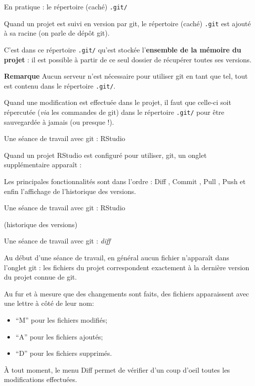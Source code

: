 \documentclass[12pt,handout,ignorenonframetext,]{beamer}
\providecommand{\tightlist}{%
  \setlength{\itemsep}{0pt}\setlength{\parskip}{0pt}}
\newcommand{\intertitre}[1]{\textbf{\textcolor{redInsee}{#1}}}
\begin{document}
\begin{frame}[fragile]{En pratique : le répertoire (caché)
\texttt{.git/}}

Quand un projet est suivi en version par git, le répertoire (caché)
\texttt{.git} est ajouté à sa racine (on parle de dépôt git).

\bigskip \pause C'est dans ce répertoire \texttt{.git/} qu'est stockée
l'\textbf{ensemble de la mémoire du projet} : il est possible à partir
de ce seul dossier de récupérer toutes ses versions.

\bigskip \pause \intertitre{Remarque} Aucun \og serveur \fg{} n'est
nécessaire pour utiliser git en tant que tel, tout est contenu dans le
répertoire \texttt{.git/}.

\bigskip \pause Quand une modification est effectuée dans le projet, il
faut que celle-ci soit répercutée (\emph{via} les commandes de git) dans
le répertoire \texttt{.git/} pour être sauvegardée à jamais (ou presque
!).

\end{frame}

\begin{frame}{Une séance de travail avec git : RStudio}

Quand un projet RStudio est configuré pour utiliser, git, un onglet
supplémentaire apparaît :

Les principales fonctionnalités sont dans l'ordre : \og Diff \fg{},
\og Commit \fg{}, \og Pull \fg{}, \og Push \fg{} et enfin l'affichage de
l'historique des versions.

\end{frame}

\begin{frame}{Une séance de travail avec git : RStudio}

(historique des versions)

\end{frame}

\begin{frame}{Une séance de travail avec git : \emph{diff}}

Au début d'une séance de travail, en général aucun fichier n'apparaît
dans l'onglet git : les fichiers du projet correspondent exactement à la
dernière version du projet connue de git.

\bigskip \pause Au fur et à mesure que des changements sont faits, des
fichiers apparaissent avec une lettre à côté de leur nom:

\begin{itemize}
\tightlist
\item
  ``M'' pour les fichiers modifiés;
\item
  ``A'' pour les fichiers ajoutés;
\item
  ``D'' pour les fichiers supprimés.
\end{itemize}

\bigskip \pause À tout moment, le menu \og Diff \fg{} permet de vérifier
d'un coup d'oeil toutes les modifications effectuées.

\end{frame}
\end{document}
